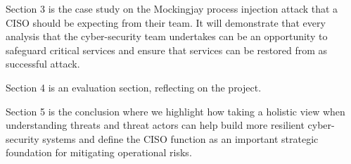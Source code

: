 
Section 3 is the case study on the Mockingjay process injection attack that a CISO should be expecting from their team.  It will demonstrate that
every analysis that the cyber-security team undertakes can be an opportunity to safeguard critical services and ensure that services can be
restored from as successful attack.




Section 4 is an evaluation section, reflecting on the project.

Section 5 is the conclusion where we highlight how taking a holistic view when understanding threats and threat actors can help build more
resilient cyber-security systems and define the CISO function as an important strategic foundation for mitigating operational risks.

